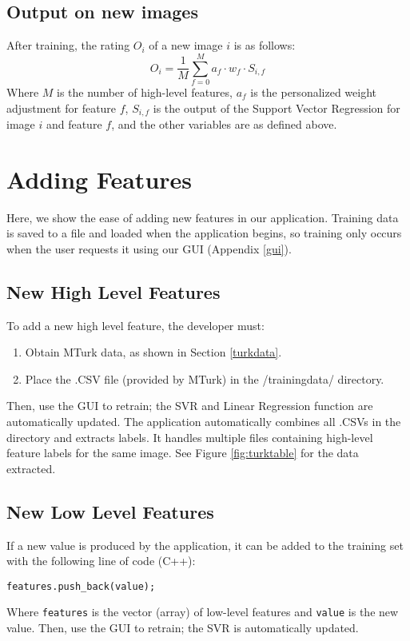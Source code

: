 \documentclass[11pt,letter]{article}
\begin{document}
\subsection{Output on new images}
After training, the rating $O_i$ of a new image $i$ is as follows:
\[
O_i=\frac{1}{M}\displaystyle\sum\limits_{f=0}^Ma_f \cdot w_f \cdot S_{i,f}
\]
Where $M$ is the number of high-level features, $a_f$ is the personalized weight adjustment for feature $f$, $S_{i,f}$ is the output of the Support Vector Regression for image $i$ and feature $f$, and the other variables are as defined above.

\section{Adding Features}
Here, we show the ease of adding new features in our application. Training data is saved to a file and loaded when the application begins, so training only occurs when the user requests it using our GUI (Appendix \ref{gui}).

\subsection{New High Level Features}
To add a new high level feature, the developer must:

\begin{enumerate}
\item Obtain MTurk data, as shown in Section \ref{turkdata}.
\item Place the .CSV file (provided by MTurk) in the /trainingdata/ directory.
\end{enumerate}

Then, use the GUI to retrain; the SVR and Linear Regression function are automatically updated. The application automatically combines all .CSVs in the directory and extracts labels. It handles multiple files containing high-level feature labels for the same image. See Figure \ref{fig:turktable} for the data extracted.

\subsection{New Low Level Features}
If a new value is produced by the application, it can be added to the training set with the following line of code (C++):

\texttt{features.push\_back(value);}

Where \texttt{features} is the vector (array) of low-level features and \texttt{value} is the new value. Then, use the GUI to retrain; the SVR is automatically updated.
\end{document}
